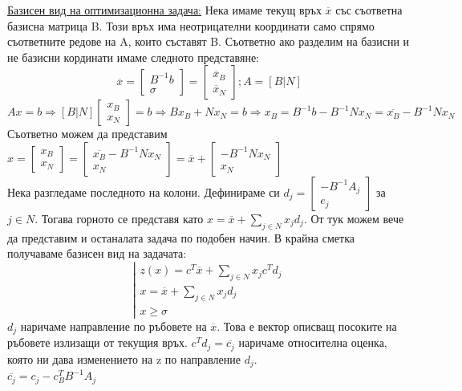 \documentclass[12pt, a4paper]{article}
\begin{document}
\underline{Базисен вид на оптимизационна задача:} Нека имаме текущ връх $\overline{x}$ със съответна базисна матрица B. Този връх има неотрицателни координати само спрямо съответните редове на A, които съставят B. Съответно ако разделим на базисни и не базисни кординати имаме следното представяне:
\[\overline{x}=\begin{bmatrix}B^{-1}b\\ \sigma\end{bmatrix}=\begin{bmatrix}\overline{x}_B\\ \overline{x}_N\end{bmatrix}; A=[B|N]\]
\[Ax=b\Rightarrow[B|N]\begin{bmatrix}x_B\\ x_N\end{bmatrix}=b\Rightarrow Bx_B+Nx_N=b\Rightarrow x_B=B^{-1}b-B^{-1}Nx_N=\overline{x_B}-B^{-1}Nx_N\]
Съответно можем да представим $x = \begin{bmatrix}x_B\\ x_N\end{bmatrix} = \begin{bmatrix}\overline{x_B}-B^{-1}Nx_N\\ x_N\end{bmatrix}=\overline{x}+\begin{bmatrix}-B^{-1}Nx_N\\ x_N\end{bmatrix}$\\
Нека разгледаме последното на колони. Дефинираме си $d_j=\begin{bmatrix}-B^{-1}A_j\\ e_j\end{bmatrix}$ за $j\in N$. Тогава горното се представя като $x=\overline{x}+\sum_{j\in N} x_j d_j$. От тук можем вече да представим и останалата задача по подобен начин. В крайна сметка получаваме базисен вид на задачата:
\[
\left|
\begin{array}{l}
z(x)=c^T\overline{x}+\sum_{j\in N}x_jc^Td_j\\
x=\overline{x}+\sum_{j\in N}x_jd_j\\
x\geq\sigma
\end{array}
\right.
\]
$d_j$ наричаме направление по ръбовете на $\overline{x}$. Това е вектор описващ посоките на ръбовете излизащи от текущия връх.
$c^Td_j=\overline{c_j}$ наричаме относителна оценка, която ни дава изменението на z по направление $d_j$.\\
$\overline{c_j} = c_j-c_B^TB^{-1}A_j$\\
\end{document}

